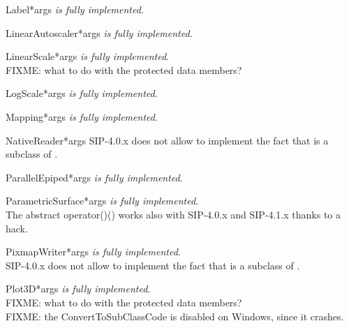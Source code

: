 \documentclass{manual}
\begin{document}
\begin{classdesc}{Label}{*args}
\emph{is fully implemented}.
\end{classdesc}

\begin{classdesc}{LinearAutoscaler}{*args}
\emph{is fully implemented}.
\end{classdesc}

\begin{classdesc}{LinearScale}{*args}
\emph{is fully implemented}.\\
FIXME: what to do with the protected data members?
\end{classdesc}

\begin{classdesc}{LogScale}{*args}
\emph{is fully implemented}.
\end{classdesc}

\begin{classdesc}{Mapping}{*args}
\emph{is fully implemented}.
\end{classdesc}

\begin{classdesc}{NativeReader}{*args}
SIP-4.0.x does not allow to implement the fact that  is a
subclass of .
\end{classdesc}

\begin{classdesc}{ParallelEpiped}{*args}
\emph{is fully implemented}.
\end{classdesc}

\begin{classdesc}{ParametricSurface}{*args}
\emph{is fully implemented}.\\
The abstract operator()() works also with SIP-4.0.x and SIP-4.1.x thanks to
a hack.
\end{classdesc}

\begin{classdesc}{PixmapWriter}{*args}
\emph{is fully implemented}.\\
SIP-4.0.x does not allow to implement the fact that  is a
subclass of .
\end{classdesc}

\begin{classdesc}{Plot3D}{*args}
\emph{is fully implemented}.\\
FIXME: what to do with the protected data members?\\
FIXME: the ConvertToSubClassCode is disabled on Windows, since it crashes.
\end{classdesc}
\end{document}
